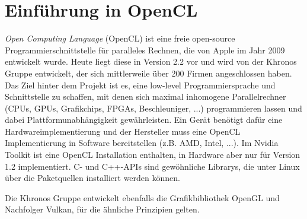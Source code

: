 	\chapter{Einf\"uhrung in OpenCL}
	\textit{Open Computing Language} (OpenCL) ist eine freie open-source Programmierschnittstelle für paralleles Rechnen, die von Apple im Jahr 2009 entwickelt wurde. Heute liegt diese in Version 2.2 vor und wird von der Khronos Gruppe entwickelt, der sich mittlerweile über 200 Firmen angeschlossen haben. Das Ziel hinter dem Projekt ist es, eine low-level Programmiersprache und Schnittstelle zu schaffen, mit denen sich maximal inhomogene Parallelrechner (CPUs, GPUs, Grafikchips, FPGAs, Beschleuniger, ...) programmieren lassen und dabei Plattformunabhängigkeit gewährleisten. Ein Gerät benötigt dafür eine Hardwareimplementierung und der Hersteller muss eine OpenCL Implementierung in Software bereitstellen (z.B. AMD, Intel, ...). Im Nvidia Toolkit ist eine OpenCL Installation enthalten, in Hardware aber nur für Version 1.2 implementiert. C- und C++-\Glspl{API} sind gewöhnliche Librarys, die unter Linux über die Paketquellen installiert werden können.
	
	Die Khronos Gruppe entwickelt ebenfalls die Grafikbibliothek OpenGL und Nachfolger Vulkan, für die ähnliche Prinzipien gelten. 
	 
